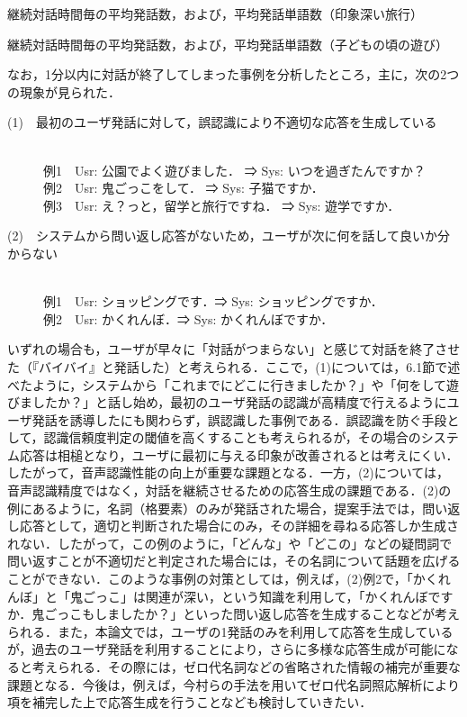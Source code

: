 \documentclass[japanese]{jnlp_1.4}
\begin{document}
\begin{table}[t]
\caption{継続対話時間毎の平均発話数，および，平均発話単語数（印象深い旅行）}
\label{table:25}

\end{table} 
\begin{table}[t]
\caption{継続対話時間毎の平均発話数，および，平均発話単語数（子どもの頃の遊び）}
\label{table:26}

\end{table} 

なお，1分以内に対話が終了してしまった事例を分析したところ，主に，次の2つの現象が見られた．

\begin{description}
\item[(1)　最初のユーザ発話に対して，誤認識により不適切な応答を生成している]\mbox{}\\
例1　Usr: 公園でよく遊びました． ⇒ Sys: いつを過ぎたんですか？\\
例2　Usr: 鬼ごっこをして． ⇒ Sys: 子猫ですか．\\
例3　Usr: え？っと，留学と旅行ですね． ⇒ Sys: 遊学ですか．

\item[(2)　システムから問い返し応答がないため，ユーザが次に何を話して良いか分からない]\mbox{}\\
例1　Usr: ショッピングです．⇒ Sys: ショッピングですか．\\
例2　Usr: かくれんぼ．⇒ Sys: かくれんぼですか．
\end{description}

いずれの場合も，ユーザが早々に「対話がつまらない」と感じて対話を終了させた（『バイバイ』と発話した）と考えられる．ここで，(1)については，6.1節で述べたように，システムから「これまでにどこに行きましたか？」や「何をして遊びましたか？」と話し始め，最初のユーザ発話の認識が高精度で行えるようにユーザ発話を誘導したにも関わらず，誤認識した事例である．誤認識を防ぐ手段として，認識信頼度判定の閾値を高くすることも考えられるが，その場合のシステム応答は相槌となり，ユーザに最初に与える印象が改善されるとは考えにくい．したがって，音声認識性能の向上が重要な課題となる．一方，(2)については，音声認識精度ではなく，対話を継続させるための応答生成の課題である．(2)の例にあるように，名詞（格要素）のみが発話された場合，提案手法では，問い返し応答として，適切と判断された場合にのみ，その詳細を尋ねる応答しか生成されない．したがって，この例のように，「どんな」や「どこの」などの疑問詞で問い返すことが不適切だと判定された場合には，その名詞について話題を広げることができない．このような事例の対策としては，例えば，(2)例2で，「かくれんぼ」と「鬼ごっこ」は関連が深い，という知識を利用して，「かくれんぼですか．鬼ごっこもしましたか？」といった問い返し応答を生成することなどが考えられる．また，本論文では，ユーザの1発話のみを利用して応答を生成しているが，過去のユーザ発話を利用することにより，さらに多様な応答生成が可能になると考えられる．その際には，ゼロ代名詞などの省略された情報の補完が重要な課題となる．今後は，例えば，今村らの手法\cite{no49}を用いてゼロ代名詞照応解析により項を補完した上で応答生成を行うことなども検討していきたい．
\end{document}
